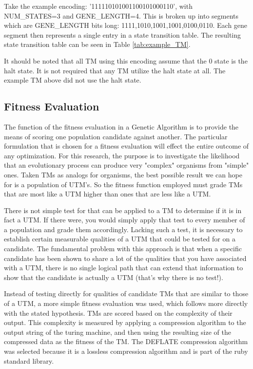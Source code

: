 Take the example encoding: '111110101001100101000110', with NUM\_STATES=3 and GENE\_LENGTH=4. This is broken up into segments which are GENE\_LENGTH bits long: 1111,1010,1001,1001,0100,0110. Each gene segment then represents a single entry in a state transition table. The resulting state transition table can be seen in Table \ref{tab:example_TM}. 

It should be noted that all TM using this encoding assume that the 0 state is the halt state. It is not required that any TM utilize the halt state at all. The example TM above did not use the halt state. 

\subsection{Fitness Evaluation} 

The function of the fitness evaluation in a Genetic Algorithm is to provide the means of scoring one population candidate against another. The particular formulation that is chosen for a fitness evaluation will effect the entire outcome of any optimization. For this research, the purpose is to investigate the likelihood that an evolutionary process can produce very "complex" organisms from "simple" ones. Taken TMs as analogs for organisms, the best possible result we can hope for is a population of UTM's. So the fitness function employed must grade TMs that are most like a UTM higher than ones that are less like a UTM.  

There is not simple test for that can be applied to a TM to determine if it is in fact a UTM. If there were, you would simply apply that test to every member of a population and grade them accordingly. Lacking such a test, it is necessary to establish certain measurable qualities of a UTM that could be tested for on a candidate. The fundamental problem with this approach is that when a specific candidate has been shown to share a lot of the qualities that you have associated with a UTM, there is no single logical path that can extend that information to show that the candidate is actually a UTM (that's why there is no test!). 

Instead of testing directly for qualities of candidate TMs that are similar to those of a UTM, a more simple fitness evaluation was used, which follows more directly with the stated hypothesis. TMs are scored based on the complexity of their output. This complexity is measured by applying a compression algorithm to the output string of the turing machine, and then using the resulting size of the compressed data as the fitness of the TM. The DEFLATE compression algorithm was selected because it is a lossless compression algorithm and is part of the ruby standard library.

